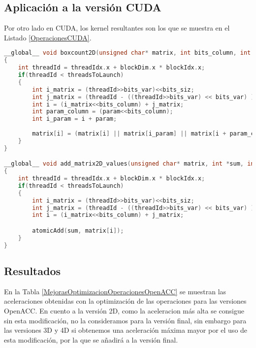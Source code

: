 \subsection{Aplicación a la versión CUDA}
Por otro lado en CUDA, los kernel resultantes son los que se muestra en el Listado \ref{OperacionesCUDA}. 
\begin{lstlisting}[language=C++,caption={Optimización de operaciones aplicada al Boxcount2D tanto en su versión CUDA},label=OperacionesCUDA]
__global__ void boxcount2D(unsigned char* matrix, int bits_column, int param, int bits_var, int threadsToLaunch, int bits_siz)
{
    int threadId = threadIdx.x + blockDim.x * blockIdx.x;
    if(threadId < threadsToLaunch)
    {
        int i_matrix = (threadId>>bits_var)<<bits_siz;
        int j_matrix = (threadId - ((threadId>>bits_var) << bits_var) )<<bits_siz;
        int i = (i_matrix<<bits_column) + j_matrix;
        int param_column = (param<<bits_column);
        int i_param = i + param;
    
        matrix[i] = (matrix[i] || matrix[i_param] || matrix[i + param_column] || matrix[i_param + param_column]);
    } 
}

__global__ void add_matrix2D_values(unsigned char* matrix, int *sum, int bits_column, int bits_var, int threadsToLaunch, int bits_siz)
{
    int threadId = threadIdx.x + blockDim.x * blockIdx.x;
    if(threadId < threadsToLaunch)
    {
        int i_matrix = (threadId>>bits_var)<<bits_siz;
        int j_matrix = (threadId - ((threadId>>bits_var) << bits_var) )<<bits_siz;
        int i = (i_matrix<<bits_column) + j_matrix;

        atomicAdd(sum, matrix[i]);
    }
}
\end{lstlisting}

\subsection{Resultados}
En la Tabla \ref{MejorasOptimizacionOperacionesOpenACC} se muestran las aceleraciones obtenidas con la optimización de las operaciones para las versiones OpenACC. En cuento a la versión 2D, como la aceleracion más alta se consigue sin esta modificación, no la consideramos para la versión final, sin embargo para las versiones 3D y 4D si obtenemos una aceleración máxima mayor por el uso de esta modificación, por la que se añadirá a la versión final. 


